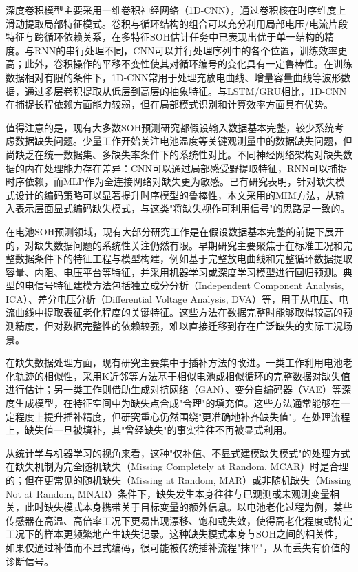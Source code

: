 \documentclass[10pt,a4paper]{ctexart}
\begin{document}
深度卷积模型主要采用一维卷积神经网络（1D-CNN），通过卷积核在时序维度上滑动提取局部特征模式\cite{zhang2024cnnsoh}。卷积与循环结构的组合可以充分利用局部电压/电流片段特征与跨循环依赖关系，在多特征SOH估计任务中已表现出优于单一结构的精度\cite{zhang2024cnnsoh}。与RNN的串行处理不同，CNN可以并行处理序列中的各个位置，训练效率更高；此外，卷积操作的平移不变性使其对循环编号的变化具有一定鲁棒性。在训练数据相对有限的条件下，1D-CNN常用于处理充放电曲线、增量容量曲线等波形数据，通过多层卷积提取从低层到高层的抽象特征。与LSTM/GRU相比，1D-CNN在捕捉长程依赖方面能力较弱，但在局部模式识别和计算效率方面具有优势。

值得注意的是，现有大多数SOH预测研究都假设输入数据基本完整，较少系统考虑数据缺失问题\cite{shao2025soh,deng2025novel}。少量工作开始关注电池温度等关键观测量中的数据缺失问题，但尚缺乏在统一数据集、多缺失率条件下的系统性对比\cite{shao2025soh}。不同神经网络架构对缺失数据的内在处理能力存在差异：CNN可以通过局部感受野提取特征，RNN可以捕捉时序依赖，而MLP作为全连接网络对缺失更为敏感。已有研究表明，针对缺失模式设计的编码策略可以显著提升时序模型的鲁棒性\cite{che2018recurrent}，本文采用的MIM方法，从输入表示层面显式编码缺失模式，与这类"将缺失视作可利用信号"的思路是一致的。

在电池SOH预测领域，现有大部分研究工作是在假设数据基本完整的前提下展开的，对缺失数据问题的系统性关注仍然有限\cite{shao2025soh}。早期研究主要聚焦于在标准工况和完整数据条件下的特征工程与模型构建，例如基于完整放电曲线和完整循环数据提取容量、内阻、电压平台等特征，并采用机器学习或深度学习模型进行回归预测。典型的电信号特征建模方法包括独立成分分析（Independent Component Analysis, ICA）、差分电压分析（Differential Voltage Analysis, DVA）等，用于从电压、电流曲线中提取表征老化程度的关键特征\cite{deng2025novel}。这些方法在数据完整时能够取得较高的预测精度，但对数据完整性的依赖较强，难以直接迁移到存在广泛缺失的实际工况场景。

在缺失数据处理方面，现有研究主要集中于插补方法的改进。一类工作利用电池老化轨迹的相似性，采用K近邻等方法基于相似电池或相似循环的完整数据对缺失值进行估计；另一类工作则借助生成对抗网络（GAN）、变分自编码器（VAE）等深度生成模型，在特征空间中为缺失点合成"合理"的填充值。这些方法通常能够在一定程度上提升插补精度，但研究重心仍然围绕"更准确地补齐缺失值"。在处理流程上，缺失值一旦被填补，其"曾经缺失"的事实往往不再被显式利用。

从统计学与机器学习的视角来看，这种"仅补值、不显式建模缺失模式"的处理方式在缺失机制为完全随机缺失（Missing Completely at Random, MCAR）时是合理的；但在更常见的随机缺失（Missing at Random, MAR）或非随机缺失（Missing Not at Random, MNAR）条件下，缺失发生本身往往与已观测或未观测变量相关，此时缺失模式本身携带关于目标变量的额外信息。以电池老化过程为例，某些传感器在高温、高倍率工况下更易出现漂移、饱和或失效，使得高老化程度或特定工况下的样本更频繁地产生缺失记录。这种缺失模式本身与SOH之间的相关性，如果仅通过补值而不显式编码，很可能被传统插补流程"抹平"，从而丢失有价值的诊断信号。
\end{document}
